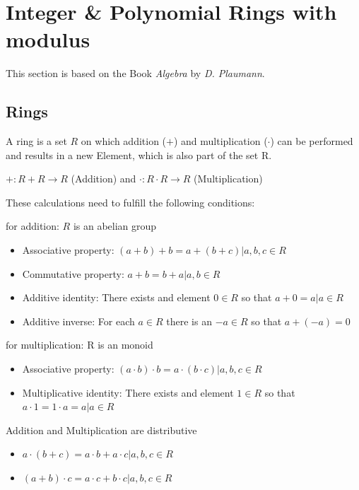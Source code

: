 \section{Integer \& Polynomial Rings with modulus}
This section is based on the Book \textit{Algebra} by \textit{D. Plaumann}\cite{Algebra}.

\subsection*{Rings}
A ring is a set $R$ on which addition ($+$) and multiplication ($\cdot$) can be performed and results in a new Element, which is also part of the set R.
\begin{center}
  $ +: R+R\rightarrow R$ (Addition) and $\cdot: R \cdot R \rightarrow R$ (Multiplication)
\end{center}

These calculations need to fulfill the following conditions:
\begin{description}
  \item for addition: $R$ is an abelian group
        \begin{itemize}
          \item Associative property: $(a+b)+b = a+(b+c) | a,b,c \in R$
          \item Commutative property: $a+b = b+a | a,b \in R$
          \item Additive identity: There exists and element $0 \in R$ so that $a+0 = a | a \in R$
          \item Additive inverse: For each $a \in R$ there is an $-a \in R$ so that $a+(-a)=0$
        \end{itemize}
  \item for multiplication: R is an monoid
        \begin{itemize}
          \item Associative property: $(a\cdot b) \cdot b = a \cdot(b\cdot c) | a,b,c \in R$
          \item Multiplicative identity: There exists and element $1 \in R$ so that $a \cdot 1 = 1 \cdot a = a | a \in R$
        \end{itemize}
  \item Addition and Multiplication are distributive
        \begin{itemize}
          \item  $a\cdot (b + c) = a\cdot b + a\cdot c | a,b,c \in R$
          \item  $(a + b) \cdot c= a\cdot c + b\cdot c | a,b,c \in R$
        \end{itemize}
\end{description}

